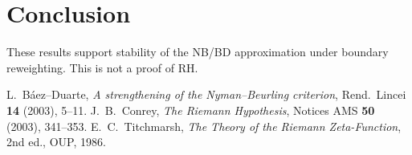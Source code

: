 \documentclass[11pt]{article}
\theoremstyle{remark}
\begin{document}
\section{Conclusion}
These results support stability of the NB/BD approximation under boundary reweighting. This is not a proof of RH.

\begin{thebibliography}{9}
 L.~B\'aez--Duarte, \emph{A strengthening of the Nyman--Beurling criterion}, Rend.\ Lincei \textbf{14} (2003), 5--11.
 J.~B.\ Conrey, \emph{The Riemann Hypothesis}, Notices AMS \textbf{50} (2003), 341--353.
 E.~C.\ Titchmarsh, \emph{The Theory of the Riemann Zeta-Function}, 2nd ed., OUP, 1986.
\end{thebibliography}
\end{document}
